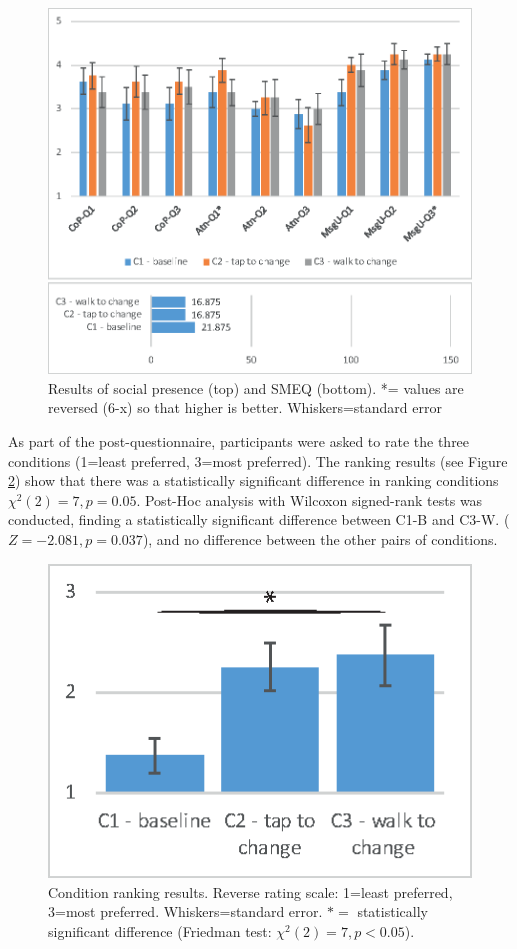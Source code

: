 \begin{figure}[ht]
  \centering
  \includegraphics[width=\columnwidth]{images/52-data-chi/images-01.eps}
  \caption{Results of social presence (top) and SMEQ (bottom). *= values are reversed (6-x) so that higher is better. Whiskers=standard error}
  \label{fig:data:results}
\end{figure}

As part of the post-questionnaire, participants were asked to rate the three conditions (1=least preferred, 3=most preferred). The ranking results (see Figure \ref{fig:data:ranking}) show that there was a statistically significant difference in ranking conditions $\chi^2(2)=7, p=0.05$. Post-Hoc analysis with Wilcoxon signed-rank tests was conducted, finding a statistically significant difference between C1-B and C3-W. ($Z=-2.081, p=0.037$), and no difference between the other pairs of conditions.

\begin{figure}[ht]
  \centering
  \includegraphics[width=.4\linewidth]{images/52-data-chi/images-05.eps}
  \caption{Condition ranking results. Reverse rating scale: 1=least preferred, 3=most preferred. Whiskers=standard error. $*=$ statistically significant difference (Friedman test: $\chi^2(2)=7, p<0.05$).}  
      \label{fig:data:ranking}
\end{figure}

